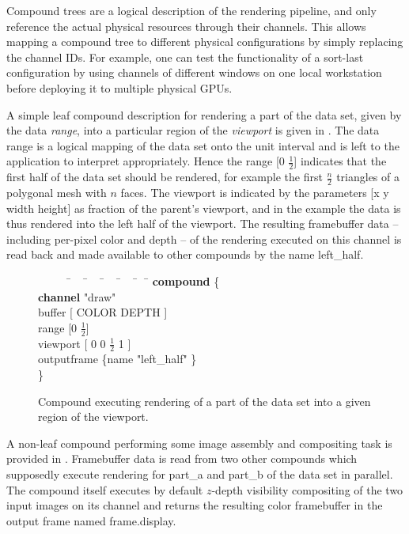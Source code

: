 Compound trees are a logical description of the rendering pipeline, and only
reference the actual physical resources through their channels. This allows
mapping a compound tree to different physical configurations by simply replacing
the channel IDs. For example, one can test the functionality of a sort-last
configuration by using channels of different windows on one local workstation
before deploying it to multiple physical GPUs.

A simple leaf compound description for rendering a part of the data set, given
by the data {\em range}, into a particular region of the {\em viewport} is
given in . The data range is a logical mapping of the
data set onto the unit interval and is left to the application to interpret
appropriately. Hence the range [0 $\frac{1}{2}$] indicates that the first half
of the data set should be rendered, for example the first $\frac{n}{2}$
triangles of a polygonal mesh with $n$ faces. The viewport is indicated by the
parameters [x y width height] as fraction of the parent's viewport, and in the
example the data is thus rendered into the left half of the viewport. The
resulting framebuffer data -- including per-pixel color and depth -- of the
rendering executed on this channel is read back and made available to other
compounds by the name left\_half.

\begin{figure}[h!t]\center
 {\begin{tabbing} \ \ \ \ \ \=\ \ \ \=\ \ \ \=\ \ \ \=\ \ \ \=\ \ \ \= \kill
   \> {\bf compound} \{						\\
   \>\> {\bf channel} "draw"					\\
   \>\> buffer  [ COLOR DEPTH ]				\\
   \>\> range [0 $\frac{1}{2}$]				\\
   \>\> viewport [ 0 0 $\frac{1}{2}$ 1 ]                 \\
   \>\> outputframe \{name "left\_half" \}	\\
   \> \}
  \end{tabbing}}
 \vspace{-2mm}
 \caption{Compound executing rendering of a part of the data set into a given region of the viewport.\label{FIG_leaf_compound}}
\end{figure}

A non-leaf compound performing some image assembly and compositing task is
provided in . Framebuffer data is read from two other
compounds which supposedly execute rendering for part\_a and part\_b of the data
set in parallel. The compound itself executes by default $z$-depth visibility
compositing of the two input images on its channel and returns the resulting
color framebuffer in the output frame named frame.display.

